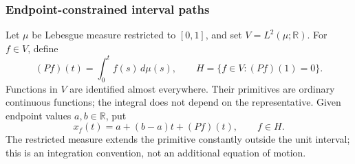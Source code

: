 \subsubsection{Endpoint-constrained interval paths}
\label{sec:variational-interval}

Let $\mu$ be Lebesgue measure restricted to $[0,1]$, and set
$V=L^2(\mu;\mathbb R)$. For $f\in V$, define
\[
 (Pf)(t)=\int_0^t f(s)\,d\mu(s),\qquad
 H=\{f\in V:(Pf)(1)=0\}.
\]
Functions in $V$ are identified almost everywhere. Their primitives
are ordinary continuous functions; the integral does not depend on
the representative. Given endpoint values $a,b\in\mathbb R$, put
\[
 x_f(t)=a+(b-a)t+(Pf)(t),\qquad f\in H.
\]
The restricted measure extends the primitive constantly outside the
unit interval; this is an integration convention, not an additional
equation of motion.

